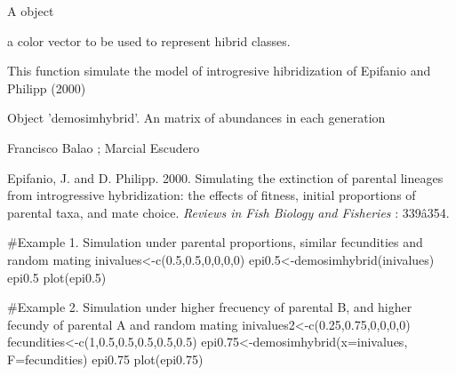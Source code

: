 \documentclass[letterpaper]{book}
\begin{document}
%
\begin{Arguments}
\begin{ldescription}

\item[\code{x}] 
A  object 

\item[\code{col}] 
a color vector to be used to represent hibrid classes.

\end{ldescription}
\end{Arguments}
%
\begin{Details}\relax
This function simulate the model of introgresive hibridization of Epifanio and Philipp (2000)
\end{Details}
%
\begin{Value}
Object 'demosimhybrid'. An matrix of abundances in each generation
\end{Value}
%
\begin{Author}\relax
Francisco Balao ;
Marcial Escudero
\end{Author}
%
\begin{References}\relax
Epifanio, J. and D. Philipp. 2000. Simulating the extinction of parental lineages from introgressive hybridization: the effects of fitness, initial proportions of parental taxa, and mate choice. \emph{Reviews in Fish Biology and Fisheries} : 339â354. 
\end{References}
%
\begin{SeeAlso}\relax
{}
\end{SeeAlso}
%
\begin{Examples}
\begin{ExampleCode}

#Example 1. Simulation under parental proportions, similar fecundities and random mating 
inivalues<-c(0.5,0.5,0,0,0,0)
epi0.5<-demosimhybrid(inivalues)
epi0.5
plot(epi0.5)

#Example 2. Simulation under higher frecuency of parental B, and higher fecundy of parental A and random mating
inivalues2<-c(0.25,0.75,0,0,0,0)
fecundities<-c(1,0.5,0.5,0.5,0.5,0.5)
epi0.75<-demosimhybrid(x=inivalues, F=fecundities)
epi0.75
plot(epi0.75)
\end{ExampleCode}
\end{Examples}
\end{document}
